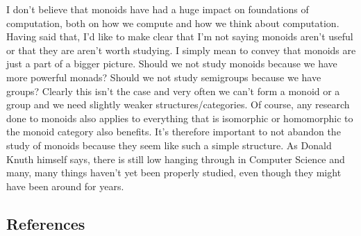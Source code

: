 \documentclass{acm_proc_article-sp}
\begin{document}
I don't believe that monoids have had a huge impact on foundations of
computation, both on how we compute and how we think about
computation. Having said that, I'd like to make clear that I'm not
saying monoids aren't useful or that they are aren't worth studying. I
simply mean to convey that monoids are just a part of a bigger
picture. Should we not study monoids because we have more powerful
monads? Should we not study semigroups because we have groups? Clearly
this isn't the case and very often we can't form a monoid or a group
and we need slightly weaker structures/categories. Of course, any
research done to monoids also applies to everything that is isomorphic
or homomorphic to the monoid category also benefits. It's therefore
important to not abandon the study of monoids because they seem like
such a simple structure. As Donald Knuth himself says, there is still
low hanging through in Computer Science and many, many things haven't
yet been properly studied, even though they might have been around for years.


\subsection{References}


\balancecolumns
\end{document}
